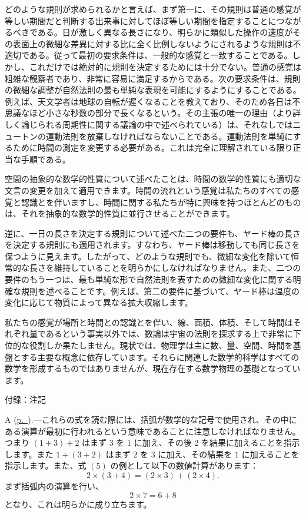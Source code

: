\documentclass[a4paper,11pt,openany]{ltjsbook}
\providecommand{\Eq}[1]{\ensuremath{#1}}
\providecommand{\Note}[1]{#1\Pagelabel{note#1}}
\providecommand{\Pagelabel}[2][page]{\phantomsection\label{#1:#2}}
\providecommand{\Pageref}[2][p.]{\hyperref[page:#2]{#1~\pageref*{page:#2}}}
\begin{document}
どのような規則が求められるかと言えば、まず第一に、その規則は普通の感覚が等しい期間だと判断する出来事に対してほぼ等しい期間を指定することにつながるべきである。日が激しく異なる長さになり、明らかに類似した操作の速度がその表面上の微細な差異に対する比に全く比例しないようにされるような規則は不適切である。従って最初の要求条件は、一般的な感覚と一致することである。しかし、これだけでは絶対的に規則を決定するためには十分でない。普通の感覚は粗雑な観察者であり、非常に容易に満足するからである。次の要求条件は、規則の微細な調整が自然法則の最も単純な表現を可能にするようにすることである。例えば、天文学者は地球の自転が遅くなることを教えており、そのため各日は不思議なほど小さな秒数の部分で長くなるという。その主張の唯一の理由（より詳しく論じられる周期性に関する議論の中で述べられている）は、それなしではニュートンの運動法則を放棄しなければならないことである。運動法則を単純にするために時間の測定を変更する必要がある。これは完全に理解されている限り正当な手順である。


空間の抽象的な数学的性質について述べたことは、時間の数学的性質にも適切な文言の変更を加えて適用できます。時間の流れという感覚は私たちのすべての感覚と認識とを伴いますし、時間に関する私たちが特に興味を持つほとんどのものは、それを抽象的な数学的性質に並行させることができます。

逆に、一日の長さを決定する規則について述べた二つの要件も、ヤード棒の長さを決定する規則にも適用されます。すなわち、ヤード棒は移動しても同じ長さを保つように見えます。したがって、どのような規則でも、微細な変化を除いて恒常的な長さを維持していることを明らかにしなければなりません。また、二つの要件のもう一つは、最も単純な形で自然法則を表すための微細な変化に関する明確な規則を述べることです。例えば、第二の要件に基づいて、ヤード棒は温度の変化に応じて物質によって異なる拡大収縮します。

私たちの感覚が場所と時間との認識とを伴い、線、面積、体積、そして時間はそれぞれ量であるという事実以外では、数論は宇宙の法則を探求する上で非常に下位的な役割しか果たしません。現状では、物理学は主に数、量、空間、時間を基盤とする主要な概念に依存しています。それらに関連した数学的科学はすべての数学を形成するものではありませんが、現在存在する数学物理の基礎となっています。

付録：注記

\Note{A} (\Pageref{60}).---これらの式を読む際には、括弧が数学的な記号で使用され、その中にある演算が最初に行われるという意味であることに注意しなければなりません。つまり $(1 + 3) + 2$ はまず $3$ を $1$ に加え、その後 $2$ を結果に加えることを指示します。また $1 + (3 + 2)$ はまず $2$ を $3$ に加え、その結果を $1$ に加えることを指示します。また、式 \Eq{(5)} の例として以下の数値計算があります：
\[
2 × (3 + 4) = (2 × 3) + (2 × 4).
\]
まず括弧内の演算を行い、
\[
2 × 7 = 6 + 8
\]
となり、これは明らかに成り立ちます。
\end{document}
